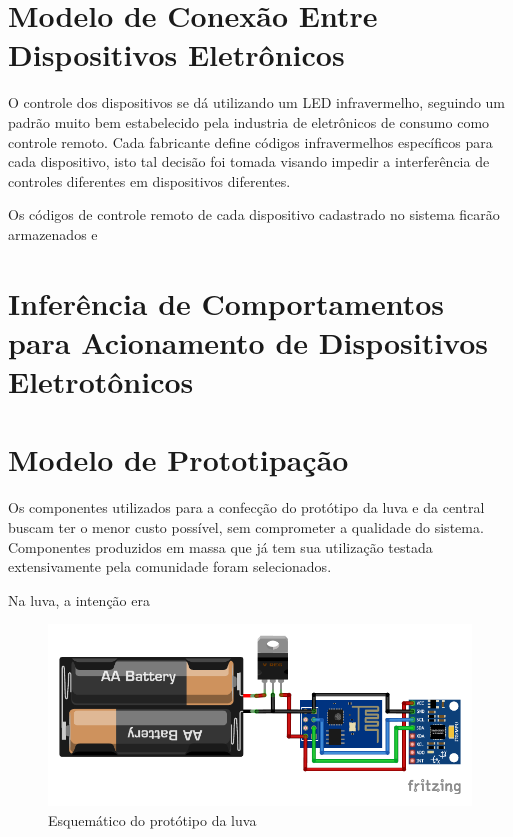 \section{Modelo de Conexão Entre Dispositivos Eletrônicos}

O controle dos dispositivos se dá utilizando um LED infravermelho, seguindo um padrão muito bem estabelecido pela industria de eletrônicos de consumo como controle remoto. Cada fabricante define códigos infravermelhos específicos para cada dispositivo, isto tal decisão foi tomada visando impedir a interferência de controles diferentes em dispositivos diferentes.

Os códigos de controle remoto de cada dispositivo cadastrado no sistema ficarão armazenados e

\section{Inferência de Comportamentos para Acionamento de Dispositivos Eletrotônicos}

\section{Modelo de Prototipação}

Os componentes utilizados para a confecção do protótipo da luva e da central buscam ter o menor custo possível, sem comprometer a qualidade do sistema. Componentes produzidos em massa que já tem sua utilização testada extensivamente pela comunidade foram selecionados. 

Na luva, a intenção era 



\begin{figure}[ht]
    \centering
    \includegraphics{resources/esquematico_tcc_bb.pdf}
    \caption{Esquemático do protótipo da luva}
    \label{fig:esq_luva}
\end{figure}


